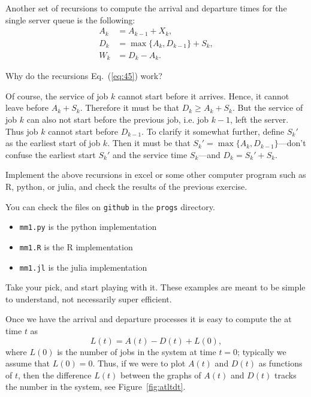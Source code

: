 Another set of recursions to compute the arrival and departure times for the single server queue is the following:
\begin{equation}
  \label{eq:45}
  \begin{split}
    A_k &= A_{k-1} + X_k, \\
    D_k &= \max\{A_k, D_{k-1}\} + S_k,\\
    W_k &= D_k - A_k.
  \end{split}
\end{equation}

\begin{exercise}  Why do the recursions Eq.~(\ref{eq:45}) work? 
  \begin{solution}
 Of course, the service of job $k$ cannot start before it
      arrives. Hence, it cannot leave before $A_k + S_k$. Therefore it
      must be that $D_k \geq A_k +S_k$. But the service of job $k$ can
      also not start before the previous job, i.e. job $k-1$, left the
      server. Thus job $k$ cannot start before $D_{k-1}$. To clarify
      it somewhat further, define $S_k'$ as the earliest start of job
      $k$. Then it must be that $S_k' = \max\{A_k, D_{k-1}\}$---don't
      confuse the earliest start $S_k'$ and the service time
      $S_k$---and $D_k = S_k' + S_k$.
    \end{solution}
\end{exercise}

\begin{exercise}
  Implement the above recursions in excel or some other computer
  program such as R, python, or julia, and check the results of the
  previous exercise.
    \begin{solution}
      You can check the files on \texttt{github} in the \texttt{progs}
      directory.
\begin{itemize}
\item \texttt{mm1.py} is the python implementation
\item \texttt{mm1.R} is the R implementation
\item \texttt{mm1.jl} is the julia implementation
\end{itemize}
Take your pick, and start playing with it. These examples are meant to
be simple to understand, not necessarily super efficient.
\end{solution}
\end{exercise}

Once we have the arrival and departure processes it is easy to compute
the  at time $t$ as
\begin{equation}\label{eq:14}
  L(t) = A(t) - D(t) + L(0),
\end{equation}
where $L(0)$ is the number of jobs in the system at time $t=0$;
typically we assume that $L(0)=0$. Thus, if we were to plot $A(t)$ and
$D(t)$ as functions of $t$, then the difference $L(t)$ between the
graphs of $A(t)$ and $D(t)$ tracks the number in the system, see
Figure~\ref{fig:atltdt}. 



